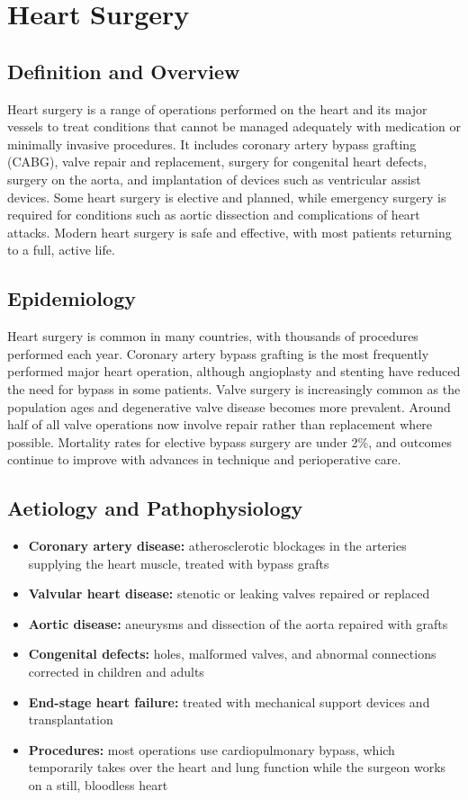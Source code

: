 \chapter{Heart Surgery}

\section*{Definition and Overview}
Heart surgery is a range of operations performed on the heart and its major vessels to treat conditions that cannot be managed adequately with medication or minimally invasive procedures. It includes coronary artery bypass grafting (CABG), valve repair and replacement, surgery for congenital heart defects, surgery on the aorta, and implantation of devices such as ventricular assist devices. Some heart surgery is elective and planned, while emergency surgery is required for conditions such as aortic dissection and complications of heart attacks. Modern heart surgery is safe and effective, with most patients returning to a full, active life.

\section*{Epidemiology}
Heart surgery is common in many countries, with thousands of procedures performed each year. Coronary artery bypass grafting is the most frequently performed major heart operation, although angioplasty and stenting have reduced the need for bypass in some patients. Valve surgery is increasingly common as the population ages and degenerative valve disease becomes more prevalent. Around half of all valve operations now involve repair rather than replacement where possible. Mortality rates for elective bypass surgery are under 2\%, and outcomes continue to improve with advances in technique and perioperative care.

\section*{Aetiology and Pathophysiology}
\begin{itemize}
    \item \textbf{Coronary artery disease:} atherosclerotic blockages in the arteries supplying the heart muscle, treated with bypass grafts
    \item \textbf{Valvular heart disease:} stenotic or leaking valves repaired or replaced
    \item \textbf{Aortic disease:} aneurysms and dissection of the aorta repaired with grafts
    \item \textbf{Congenital defects:} holes, malformed valves, and abnormal connections corrected in children and adults
    \item \textbf{End-stage heart failure:} treated with mechanical support devices and transplantation
    \item \textbf{Procedures:} most operations use cardiopulmonary bypass, which temporarily takes over the heart and lung function while the surgeon works on a still, bloodless heart
\end{itemize}


